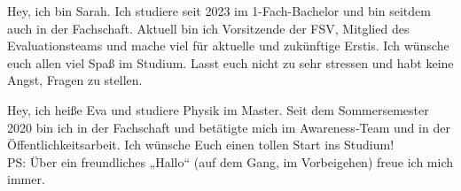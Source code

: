\begin{multicols}{2}
\vspace{-1.2cm}

{
Hey, ich bin Sarah. Ich studiere seit 2023 im 1-Fach-Bachelor und bin seitdem auch in der Fachschaft. Aktuell bin ich Vorsitzende der FSV, Mitglied des Evaluationsteams und mache viel für aktuelle und zukünftige Erstis. Ich wünsche euch allen viel Spaß im Studium. Lasst euch nicht zu sehr stressen und habt keine Angst, Fragen zu stellen.
}

\vspace{-1cm}

{
Hey, ich heiße Eva und studiere Physik im Master. Seit dem Sommersemester 2020 bin ich in der Fachschaft und betätigte mich im Awareness-Team und in der Öffentlichkeitsarbeit.
Ich wünsche Euch einen tollen Start ins Studium! \\ PS: Über ein freundliches „Hallo“ (auf dem Gang, im Vorbeigehen) freue ich mich immer.
} 



\end{multicols}
